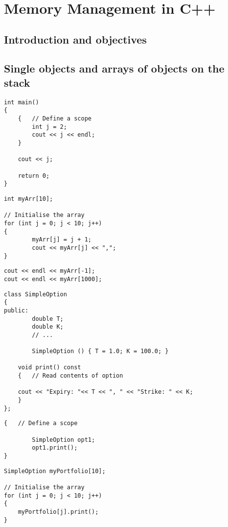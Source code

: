 \chapter{Memory Management in C++}

\section{Introduction and objectives}

\section{Single objects and arrays of objects on the stack}

\begin{lstlisting}
int main()
{
	{	// Define a scope
		int j = 2;
		cout << j << endl;
	}

	cout << j;

	return 0;
}
\end{lstlisting}

\begin{lstlisting}
int myArr[10];

// Initialise the array
for (int j = 0; j < 10; j++)
{
		myArr[j] = j + 1;
		cout << myArr[j] << ",";
}
\end{lstlisting}

\begin{lstlisting}
cout << endl << myArr[-1];
cout << endl << myArr[1000];
\end{lstlisting}

\begin{lstlisting}
class SimpleOption
{
public:
		double T;
		double K;
		// ...

		SimpleOption () { T = 1.0; K = 100.0; }

	void print() const
	{	// Read contents of option

	cout << "Expiry: "<< T << ", " << "Strike: " << K;
	}
};
\end{lstlisting}

\begin{lstlisting}
{	// Define a scope

		SimpleOption opt1;
		opt1.print();
}
\end{lstlisting}

\begin{lstlisting}
SimpleOption myPortfolio[10];

// Initialise the array
for (int j = 0; j < 10; j++)
{
	myPortfolio[j].print();
}
\end{lstlisting}

